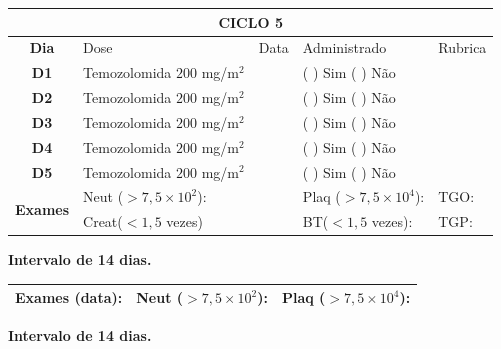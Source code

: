 \documentclass[11pt,a4paper,oldfontcommands]{memoir}
\begin{document}
\begin{center}
\begin{longtable}{p{1cm}p{4cm}|p{1cm}|p{4.6cm}|p{3cm}}
	\hline
	\multicolumn{5}{c}{\textbf{CICLO 5}}\\
\hline
    \multicolumn{1}{c|}{\multirow{1}{*}{\textbf{Dia}}}&{Dose}&{Data}&{Administrado}&{Rubrica} \\
    \hline
    \multicolumn{1}{c|}{\multirow{1}{*}{\textbf{D1}}}&{Temozolomida \(200\) mg/m\(^2\)}&&{(  ) Sim (  ) Não}&\\
    \multicolumn{1}{c|}{\multirow{1}{*}{\textbf{D2}}}&{Temozolomida \(200\) mg/m\(^2\)}&&{(  ) Sim (  ) Não}&\\
    \multicolumn{1}{c|}{\multirow{1}{*}{\textbf{D3}}}&{Temozolomida \(200\) mg/m\(^2\)}&&{(  ) Sim (  ) Não}&\\
    \multicolumn{1}{c|}{\multirow{1}{*}{\textbf{D4}}}&{Temozolomida \(200\) mg/m\(^2\)}&&{(  ) Sim (  ) Não}&\\
    \multicolumn{1}{c|}{\multirow{1}{*}{\textbf{D5}}}&{Temozolomida \(200\) mg/m\(^2\)}&&{(  ) Sim (  ) Não}&\\
    \hline
    \multicolumn{1}{c|}{\multirow{2}{*}{\textbf{Exames}}}&\multicolumn{2}{l|}{Neut (\(>7,5\times10^2\)):}&{Plaq (\(>7,5\times10^4\)):}&{TGO:}\\
    \cline{2-5}
    \multicolumn{1}{c|}{\multirow{2}{*}{{}}}&\multicolumn{2}{l|}{Creat(\(<1,5\) vezes)}&{BT(\(<1,5\) vezes):}&{TGP:}
    \\
    \hline
\end{longtable}
\textbf{Intervalo de 14 dias.}
\begin{longtable}{p{5cm}|p{5cm}|p{4.5cm}}
    \hline
    \textbf{Exames (data):}&{Neut (\(>7,5\times10^2\)):}&{Plaq (\(>7,5\times10^4\)):}
    \\
    \hline
\end{longtable}
\textbf{Intervalo de 14 dias.}
\end{center}
\clearpage
\end{document}

